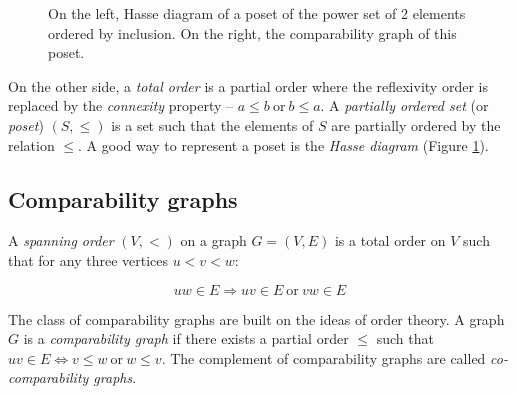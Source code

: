 \begin{figure}
\centering

\begin{scaletikzpicturetowidth}{\textwidth}
\end{scaletikzpicturetowidth}

\caption{On the left, Hasse diagram of a poset of the power set of 2 elements ordered by inclusion.
On the right, the comparability graph of this poset.}
\label{fig:hasse}
\end{figure}

On the other side, a \emph{total order} is a partial order where the reflexivity order is replaced by the \emph{connexity} property -- $a \leq b\ \text{or}\  b \leq a$. A \emph{partially ordered set} (or \emph{poset}) $(S,\leqslant)$ is a set such that the elements of $S$ are partially ordered by the relation $\leqslant$. A good way to represent a poset is the \emph{Hasse diagram} (Figure \ref{fig:hasse}).

\subsection{Comparability graphs}

A \emph{spanning order} $(V,<)$ on a graph $G = (V,E)$ is a total order on $V$ such that for any three vertices $u < v < w$:

  $$uw \in E \Rightarrow uv \in E\ \text{or}\ vw \in E$$

The class of comparability graphs are built on the ideas of order theory. A graph $G$ is a \emph{comparability graph} if there exists a partial order $\leqslant$ such that $uv \in E \Leftrightarrow v \leqslant w\  \text{or}\  w \leqslant v$. The complement of comparability graphs are called \emph{co-comparability graphs}.


